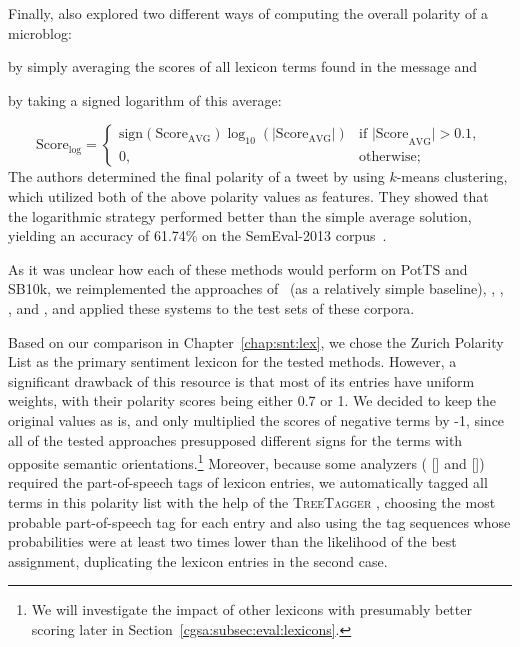 Finally, \citet{Kolchyna:15} also explored two different ways of
computing the overall polarity of a microblog:
\begin{inparaenum}[(i)]
\item by simply averaging the scores of all lexicon terms found in the
  message and
\item by taking a signed logarithm of this average:
\end{inparaenum}
\begin{equation*}
  \text{Score}_{\log} =
  \begin{cases}
    \text{sign}(\text{Score}_{\text{AVG}})\log_{10}(|\text{Score}_{\text{AVG}}|) & %
    \text{if |Score}_{\text{AVG}}| > 0.1,\\
    0, & \text{otherwise};
  \end{cases}
\end{equation*}%
The authors determined the final polarity of a tweet by using
$k$-means clustering, which utilized both of the above polarity values
as features.  They showed that the logarithmic strategy performed
better than the simple average solution, yielding an accuracy of
61.74\% on the SemEval-2013 corpus~\cite{Nakov:13}.


As it was unclear how each of these methods would perform on PotTS and
SB10k, we reimplemented the approaches of~\citet{Hu:04} (as a
relatively simple baseline), \citet{Taboada:11}, \citet{Musto:14},
\citet{Jurek:15}, and \citet{Kolchyna:15}, and applied these systems
to the test sets of these corpora.

Based on our comparison in Chapter~\ref{chap:snt:lex}, we chose the
Zurich Polarity List \cite{Clematide:10} as the primary sentiment
lexicon for the tested methods.  However, a significant drawback of
this resource is that most of its entries have uniform weights, with
their polarity scores being either 0.7 or 1.  We decided to keep the
original values as is, and only multiplied the scores of negative
terms by -1, since all of the tested approaches presupposed different
signs for the terms with opposite semantic orientations.\footnote{We
  will investigate the impact of other lexicons with presumably better
  scoring later in Section~\ref{cgsa:subsec:eval:lexicons}.}
Moreover, because some analyzers (\eg{} \citeauthor{Taboada:11}
[\citeyear{Taboada:11}] and \citeauthor{Musto:14}
[\citeyear{Musto:14}]) required the part-of-speech tags of lexicon
entries, we automatically tagged all terms in this polarity list with
the help of the \textsc{TreeTagger} \cite{Schmid:95}, choosing the
most probable part-of-speech tag for each entry and also using the tag
sequences whose probabilities were at least two times lower than the
likelihood of the best assignment, duplicating the lexicon entries in
the second case.

